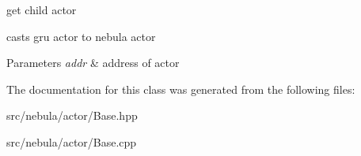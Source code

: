 get child actor 

casts gru actor to nebula actor 
\begin{DoxyParams}{\-Parameters}
{\em addr} & address of actor \\
\hline
\end{DoxyParams}


\-The documentation for this class was generated from the following files\-:\begin{DoxyCompactItemize}
\item 
src/nebula/actor/\-Base.\-hpp\item 
src/nebula/actor/\-Base.\-cpp\end{DoxyCompactItemize}
